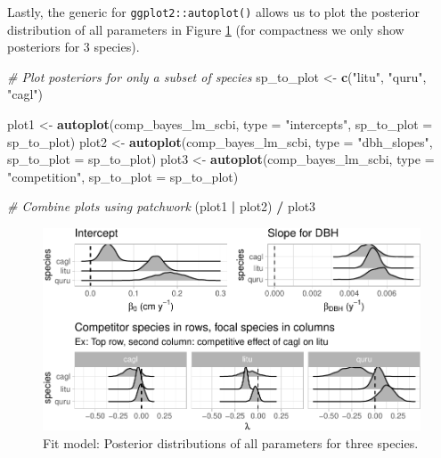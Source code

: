 \documentclass[12pt]{article}
\newenvironment{Shaded}{\begin{snugshade}}{\end{snugshade}}
\newcommand{\CommentTok}[1]{\textcolor[rgb]{0.56,0.35,0.01}{\textit{#1}}}
\newcommand{\DataTypeTok}[1]{\textcolor[rgb]{0.13,0.29,0.53}{#1}}
\newcommand{\KeywordTok}[1]{\textcolor[rgb]{0.13,0.29,0.53}{\textbf{#1}}}
\newcommand{\NormalTok}[1]{#1}
\newcommand{\OperatorTok}[1]{\textcolor[rgb]{0.81,0.36,0.00}{\textbf{#1}}}
\newcommand{\StringTok}[1]{\textcolor[rgb]{0.31,0.60,0.02}{#1}}
\begin{document}
Lastly, the generic for \texttt{ggplot2::autoplot()} allows us to plot
the posterior distribution of all parameters in Figure
\ref{fig:scbi-posterior-viz} (for compactness we only show posteriors
for 3 species).

\begin{Shaded}
\begin{Highlighting}[]
\CommentTok{# Plot posteriors for only a subset of species}
\NormalTok{sp_to_plot <-}\StringTok{ }\KeywordTok{c}\NormalTok{(}\StringTok{"litu"}\NormalTok{, }\StringTok{"quru"}\NormalTok{, }\StringTok{"cagl"}\NormalTok{)}

\NormalTok{plot1 <-}\StringTok{ }\KeywordTok{autoplot}\NormalTok{(comp_bayes_lm_scbi, }\DataTypeTok{type =} \StringTok{"intercepts"}\NormalTok{, }\DataTypeTok{sp_to_plot =}\NormalTok{ sp_to_plot)}
\NormalTok{plot2 <-}\StringTok{ }\KeywordTok{autoplot}\NormalTok{(comp_bayes_lm_scbi, }\DataTypeTok{type =} \StringTok{"dbh_slopes"}\NormalTok{, }\DataTypeTok{sp_to_plot =}\NormalTok{ sp_to_plot)}
\NormalTok{plot3 <-}\StringTok{ }\KeywordTok{autoplot}\NormalTok{(comp_bayes_lm_scbi, }\DataTypeTok{type =} \StringTok{"competition"}\NormalTok{, }\DataTypeTok{sp_to_plot =}\NormalTok{ sp_to_plot)}

\CommentTok{# Combine plots using patchwork}
\NormalTok{(plot1 }\OperatorTok{|}\StringTok{ }\NormalTok{plot2) }\OperatorTok{/}\StringTok{ }\NormalTok{plot3}
\end{Highlighting}
\end{Shaded}

\begin{figure}

{\centering \includegraphics[width=1\linewidth]{Figures/scbi-posterior-viz-1} 

}

\caption{Fit model: Posterior distributions of all parameters for three species.}\label{fig:scbi-posterior-viz}
\end{figure}
\end{document}

